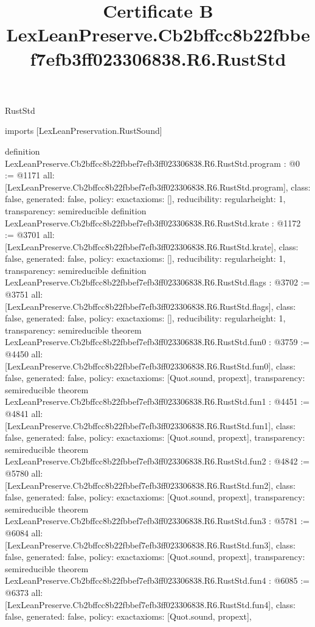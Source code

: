 \begin{lexlean}{RustStd}
\title{Certificate B LexLeanPreserve.Cb2bffcc8b22fbbef7efb3ff023306838.R6.RustStd}
\begin{coremodule}
imports [LexLeanPreservation.RustSound]

definition LexLeanPreserve.Cb2bffcc8b22fbbef7efb3ff023306838.R6.RustStd.program : @0 := @1171 {
  all: [LexLeanPreserve.Cb2bffcc8b22fbbef7efb3ff023306838.R6.RustStd.program],
  class: false,
  generated: false,
  policy: exact{axioms: []},
  reducibility: regular{height: 1},
  transparency: semireducible
}
definition LexLeanPreserve.Cb2bffcc8b22fbbef7efb3ff023306838.R6.RustStd.krate : @1172 := @3701 {
  all: [LexLeanPreserve.Cb2bffcc8b22fbbef7efb3ff023306838.R6.RustStd.krate],
  class: false,
  generated: false,
  policy: exact{axioms: []},
  reducibility: regular{height: 1},
  transparency: semireducible
}
definition LexLeanPreserve.Cb2bffcc8b22fbbef7efb3ff023306838.R6.RustStd.flags : @3702 := @3751 {
  all: [LexLeanPreserve.Cb2bffcc8b22fbbef7efb3ff023306838.R6.RustStd.flags],
  class: false,
  generated: false,
  policy: exact{axioms: []},
  reducibility: regular{height: 1},
  transparency: semireducible
}
theorem LexLeanPreserve.Cb2bffcc8b22fbbef7efb3ff023306838.R6.RustStd.fun0 : @3759 := @4450 {
  all: [LexLeanPreserve.Cb2bffcc8b22fbbef7efb3ff023306838.R6.RustStd.fun0],
  class: false,
  generated: false,
  policy: exact{axioms: [Quot.sound, propext]},
  transparency: semireducible
}
theorem LexLeanPreserve.Cb2bffcc8b22fbbef7efb3ff023306838.R6.RustStd.fun1 : @4451 := @4841 {
  all: [LexLeanPreserve.Cb2bffcc8b22fbbef7efb3ff023306838.R6.RustStd.fun1],
  class: false,
  generated: false,
  policy: exact{axioms: [Quot.sound, propext]},
  transparency: semireducible
}
theorem LexLeanPreserve.Cb2bffcc8b22fbbef7efb3ff023306838.R6.RustStd.fun2 : @4842 := @5780 {
  all: [LexLeanPreserve.Cb2bffcc8b22fbbef7efb3ff023306838.R6.RustStd.fun2],
  class: false,
  generated: false,
  policy: exact{axioms: [Quot.sound, propext]},
  transparency: semireducible
}
theorem LexLeanPreserve.Cb2bffcc8b22fbbef7efb3ff023306838.R6.RustStd.fun3 : @5781 := @6084 {
  all: [LexLeanPreserve.Cb2bffcc8b22fbbef7efb3ff023306838.R6.RustStd.fun3],
  class: false,
  generated: false,
  policy: exact{axioms: [Quot.sound, propext]},
  transparency: semireducible
}
theorem LexLeanPreserve.Cb2bffcc8b22fbbef7efb3ff023306838.R6.RustStd.fun4 : @6085 := @6373 {
  all: [LexLeanPreserve.Cb2bffcc8b22fbbef7efb3ff023306838.R6.RustStd.fun4],
  class: false,
  generated: false,
  policy: exact{axioms: [Quot.sound, propext]},
}
\end{coremodule}
\end{lexlean}
